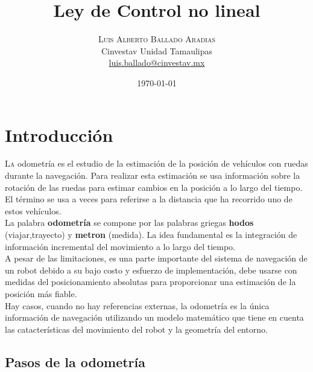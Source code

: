 \documentclass[oneside,twocolumn]{article}
\title{Ley de Control no lineal} %
\author{%
\textsc{Luis Alberto Ballado Aradias} \\%
\normalsize Cinvestav Unidad Tamaulipas \\ %
\normalsize \href{mailto:luis.ballado@cinvestav.mx}{luis.ballado@cinvestav.mx} %
}
\date{\today} %
\begin{document}
\maketitle


\section{Introducción}

\lettrine[nindent=0em,lines=3]{L}a odometría es el estudio de la estimación de la posición de vehículos con ruedas durante la navegación. Para realizar esta estimación se usa información sobre la rotación de las ruedas para estimar cambios en la posición a lo largo del tiempo. El término se usa a veces para referirse a la distancia que ha recorrido uno de estos vehículos.\\

La palabra \textbf{odometría} se compone por las palabras griegas \textbf{hodos} (viajar,trayecto) y \textbf{metron} (medida). La idea fundamental es la integración de información incremental del movimiento a lo largo del tiempo.\\

A pesar de las limitaciones, es una parte importante del sistema de navegación de un robot debido a su bajo costo y esfuerzo de implementación, debe usarse con medidas del posicionamiento absolutas para proporcionar una estimación de la posición más fiable.\\

Hay casos, cuando no hay referencias externas, la odometría es la única información de navegación utilizando un modelo matemático que tiene en cuenta las catacterísticas del movimiento del robot y la geometría del entorno. %


\subsection{Pasos de la odometría}
\end{document}
